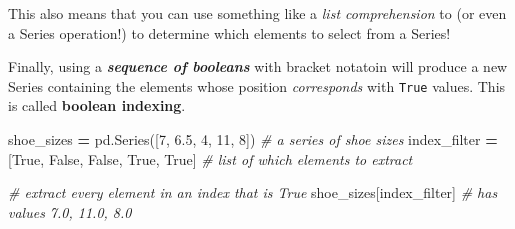 \documentclass[]{book}
\newenvironment{Shaded}{\begin{snugshade}}{\end{snugshade}}
\newcommand{\KeywordTok}[1]{\textcolor[rgb]{0.13,0.29,0.53}{\textbf{#1}}}
\newcommand{\DecValTok}[1]{\textcolor[rgb]{0.00,0.00,0.81}{#1}}
\newcommand{\FloatTok}[1]{\textcolor[rgb]{0.00,0.00,0.81}{#1}}
\newcommand{\StringTok}[1]{\textcolor[rgb]{0.31,0.60,0.02}{#1}}
\newcommand{\CommentTok}[1]{\textcolor[rgb]{0.56,0.35,0.01}{\textit{#1}}}
\newcommand{\VariableTok}[1]{\textcolor[rgb]{0.00,0.00,0.00}{#1}}
\newcommand{\ControlFlowTok}[1]{\textcolor[rgb]{0.13,0.29,0.53}{\textbf{#1}}}
\newcommand{\OperatorTok}[1]{\textcolor[rgb]{0.81,0.36,0.00}{\textbf{#1}}}
\newcommand{\BuiltInTok}[1]{#1}
\newcommand{\NormalTok}[1]{#1}
\begin{document}
This also means that you can use something like a \emph{list
comprehension} to (or even a Series operation!) to determine which
elements to select from a Series!

\begin{Shaded}
\end{Shaded}

Finally, using a \textbf{\emph{sequence of booleans}} with bracket
notatoin will produce a new Series containing the elements whose
position \emph{corresponds} with \texttt{True} values. This is called
\textbf{boolean indexing}.

\begin{Shaded}
\begin{Highlighting}[]
\NormalTok{shoe_sizes }\OperatorTok{=}\NormalTok{ pd.Series([}\DecValTok{7}\NormalTok{, }\FloatTok{6.5}\NormalTok{, }\DecValTok{4}\NormalTok{, }\DecValTok{11}\NormalTok{, }\DecValTok{8}\NormalTok{])  }\CommentTok{# a series of shoe sizes}
\NormalTok{index_filter }\OperatorTok{=}\NormalTok{ [}\VariableTok{True}\NormalTok{, }\VariableTok{False}\NormalTok{, }\VariableTok{False}\NormalTok{, }\VariableTok{True}\NormalTok{, }\VariableTok{True}\NormalTok{]  }\CommentTok{# list of which elements to extract}

\CommentTok{# extract every element in an index that is True}
\NormalTok{shoe_sizes[index_filter]  }\CommentTok{# has values 7.0, 11.0, 8.0}
\end{Highlighting}
\end{Shaded}
\end{document}
